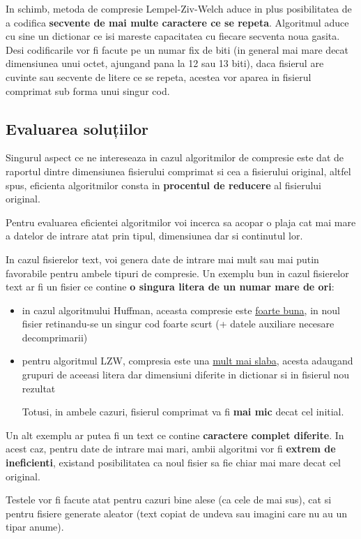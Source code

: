 \documentclass[runningheads]{llncs}
\begin{document}
In schimb, metoda de compresie Lempel-Ziv-Welch aduce in plus posibilitatea de
a codifica \textbf{secvente de mai multe caractere ce se repeta}. Algoritmul aduce cu sine
un dictionar ce isi mareste capacitatea cu fiecare secventa noua gasita.
Desi codificarile vor fi facute pe un numar fix de biti (in general mai mare decat
dimensiunea unui octet, ajungand pana la 12 sau 13 biti), daca fisierul are cuvinte
sau secvente de litere ce se repeta, acestea vor aparea in fisierul comprimat sub forma
unui singur cod.


\subsection{Evaluarea soluțiilor}
Singurul aspect ce ne intereseaza in cazul algoritmilor de compresie este dat de raportul
dintre dimensiunea fisierului comprimat si cea a fisierului original, altfel spus, eficienta
algoritmilor consta in \textbf{procentul de reducere} al fisierului original.

Pentru evaluarea eficientei algoritmilor voi incerca sa acopar o plaja cat mai mare a
datelor de intrare atat prin tipul, dimensiunea dar si continutul lor.

In cazul fisierelor text, voi genera date de intrare mai mult sau mai putin favorabile
pentru ambele tipuri de compresie. Un exemplu bun in cazul fisierelor text ar fi un fisier
ce contine \textbf{o singura litera de un numar mare de ori}:

\begin{itemize}
    \item in cazul algoritmului Huffman, aceasta compresie este \underline{foarte buna},
    in noul fisier retinandu-se un singur cod foarte scurt (+ datele auxiliare necesare decomprimarii)
    \item pentru algoritmul LZW, compresia este una \underline{mult mai slaba}, acesta adaugand grupuri
    de aceeasi litera dar dimensiuni diferite in dictionar si in fisierul nou rezultat

    Totusi, in ambele cazuri, fisierul comprimat va fi \textbf{mai mic} decat cel initial.
\end{itemize}

Un alt exemplu ar putea fi un text ce contine \textbf{caractere complet diferite}. In acest caz,
pentru date de intrare mai mari, ambii algoritmi vor fi \textbf{extrem de ineficienti}, existand
posibilitatea ca noul fisier sa fie chiar mai mare decat cel original.

Testele vor fi facute atat pentru cazuri bine alese (ca cele de mai sus), cat si pentru
fisiere generate aleator (text copiat de undeva sau imagini care nu au un tipar anume).
\end{document}
